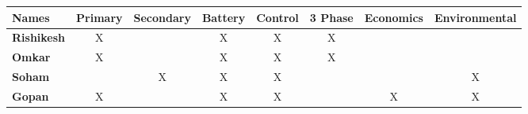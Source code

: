 \begin{table}[H]
\begin{tabular}{|l|c|c|c|c|c|c|c|}
\hline
\textbf{Names}     & \multicolumn{1}{l|}{\textbf{Primary}} & \multicolumn{1}{l|}{\textbf{Secondary}} & \multicolumn{1}{l|}{\textbf{Battery}} & \multicolumn{1}{l|}{\textbf{Control}} & \multicolumn{1}{l|}{\textbf{3 Phase}} & \multicolumn{1}{l|}{\textbf{Economics}} & \multicolumn{1}{l|}{\textbf{Environmental}} \\ \hline
\textbf{Rishikesh} & X                                     &                                         & X                                     & X                                     & X                                     &                                         &                                             \\ \hline
\textbf{Omkar}     & X                                     &                                         & X                                     & X                                     & X                                     &                                         &                                             \\ \hline
\textbf{Soham}     &                                       & X                                       & X                                     & X                                     &                                       &                                         & X                                           \\ \hline
\textbf{Gopan}     & X                                     &                                         & X                                     & X                                     &                                       & X                                       & X                                           \\ \hline
\end{tabular}
\end{table}
